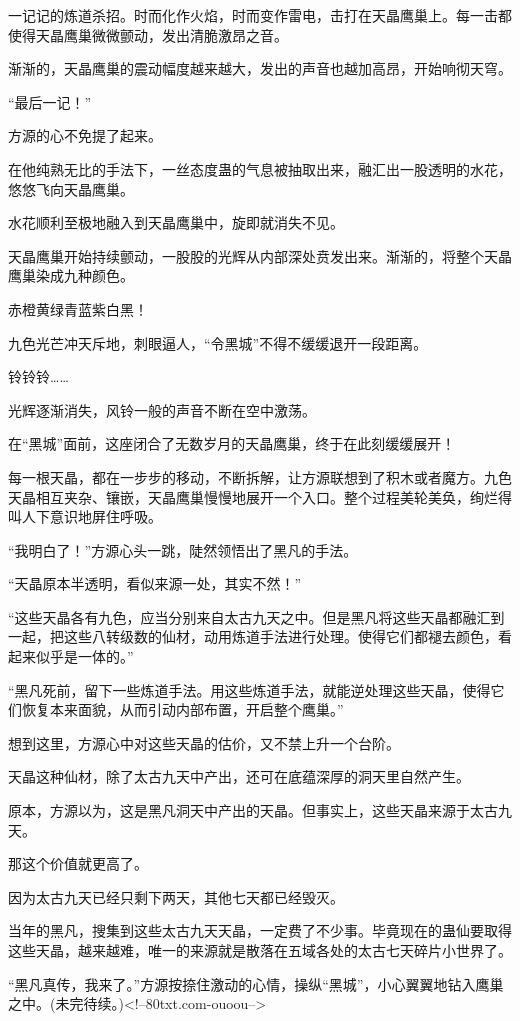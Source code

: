 \begin{this_body}
一记记的炼道杀招。时而化作火焰，时而变作雷电，击打在天晶鹰巢上。每一击都使得天晶鹰巢微微颤动，发出清脆激昂之音。

渐渐的，天晶鹰巢的震动幅度越来越大，发出的声音也越加高昂，开始响彻天穹。

“最后一记！”

方源的心不免提了起来。

在他纯熟无比的手法下，一丝态度蛊的气息被抽取出来，融汇出一股透明的水花，悠悠飞向天晶鹰巢。

水花顺利至极地融入到天晶鹰巢中，旋即就消失不见。

天晶鹰巢开始持续颤动，一股股的光辉从内部深处贲发出来。渐渐的，将整个天晶鹰巢染成九种颜色。

赤橙黄绿青蓝紫白黑！

九色光芒冲天斥地，刺眼逼人，“令黑城”不得不缓缓退开一段距离。

铃铃铃……

光辉逐渐消失，风铃一般的声音不断在空中激荡。

在“黑城”面前，这座闭合了无数岁月的天晶鹰巢，终于在此刻缓缓展开！

每一根天晶，都在一步步的移动，不断拆解，让方源联想到了积木或者魔方。九色天晶相互夹杂、镶嵌，天晶鹰巢慢慢地展开一个入口。整个过程美轮美奂，绚烂得叫人下意识地屏住呼吸。

“我明白了！”方源心头一跳，陡然领悟出了黑凡的手法。

“天晶原本半透明，看似来源一处，其实不然！”

“这些天晶各有九色，应当分别来自太古九天之中。但是黑凡将这些天晶都融汇到一起，把这些八转级数的仙材，动用炼道手法进行处理。使得它们都褪去颜色，看起来似乎是一体的。”

“黑凡死前，留下一些炼道手法。用这些炼道手法，就能逆处理这些天晶，使得它们恢复本来面貌，从而引动内部布置，开启整个鹰巢。”

想到这里，方源心中对这些天晶的估价，又不禁上升一个台阶。

天晶这种仙材，除了太古九天中产出，还可在底蕴深厚的洞天里自然产生。

原本，方源以为，这是黑凡洞天中产出的天晶。但事实上，这些天晶来源于太古九天。

那这个价值就更高了。

因为太古九天已经只剩下两天，其他七天都已经毁灭。

当年的黑凡，搜集到这些太古九天天晶，一定费了不少事。毕竟现在的蛊仙要取得这些天晶，越来越难，唯一的来源就是散落在五域各处的太古七天碎片小世界了。

“黑凡真传，我来了。”方源按捺住激动的心情，操纵“黑城”，小心翼翼地钻入鹰巢之中。(未完待续。)<!--80txt.com-ouoou-->

\end{this_body}

